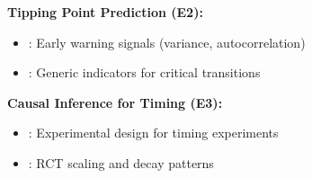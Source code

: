 \begin{tcolorbox}[colback=green!5!white, colframe=green!75!black,
    title=\textbf{PRO Evidence: Supporting Literature}]
\textbf{Tipping Point Prediction (E2):}
\begin{itemize}[nosep]
\item \citet{scheffer2009early}: Early warning signals (variance, autocorrelation)
\item \citet{scheffer2012anticipating}: Generic indicators for critical transitions
\end{itemize}

\textbf{Causal Inference for Timing (E3):}
\begin{itemize}[nosep]
\item \citet{athey2017econometrics}: Experimental design for timing experiments
\item \citet{dellavigna2022rcts}: RCT scaling and decay patterns
\end{itemize}

\end{tcolorbox}

